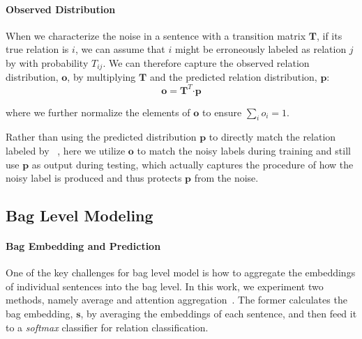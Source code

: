 \paragraph{Observed Distribution}
When we characterize the noise in a sentence with a transition matrix $\mathbf{T}$,
if its true relation is $i$, we can assume that  $i$ might be erroneously labeled as relation $j$ 
by \DS  with probability $T_{ij}$. 
We can therefore capture the observed relation distribution, $\mathbf{o}$, by
multiplying %
$\mathbf{T}$ and the predicted relation distribution, $\mathbf{p}$:
 \begin{equation}
\mathbf{o} = \mathbf{T}^T \bm\cdot \mathbf{p}
\label{eq_transition}
 \end{equation}

where %
we further normalize the elements of $\mathbf{o}$ to ensure $\sum_i{o_i}=1$.

Rather than using the predicted distribution $\mathbf{p}$ to directly match the relation labeled by \DS~\cite{zeng2015distant,lin2016neural}, 
here we utilize $\mathbf{o}$ to match the noisy labels during training and still use $\mathbf{p}$ as output during testing,
which actually captures the procedure of how the noisy label is produced and thus protects $\mathbf{p}$ from the noise.
%

\subsection{Bag Level Modeling \label{sec:baglevelmodeling}}
\paragraph{Bag Embedding and Prediction}
One of the key challenges for bag level model is how to aggregate the embeddings of individual sentences into the bag level.
In this work, we experiment two methods, namely average and attention aggregation~\cite{lin2016neural}.
The former calculates the bag embedding, $\mathbf{s}$, by averaging the embeddings of each sentence, and  then feed it to a \emph{softmax} classifier for relation classification.

